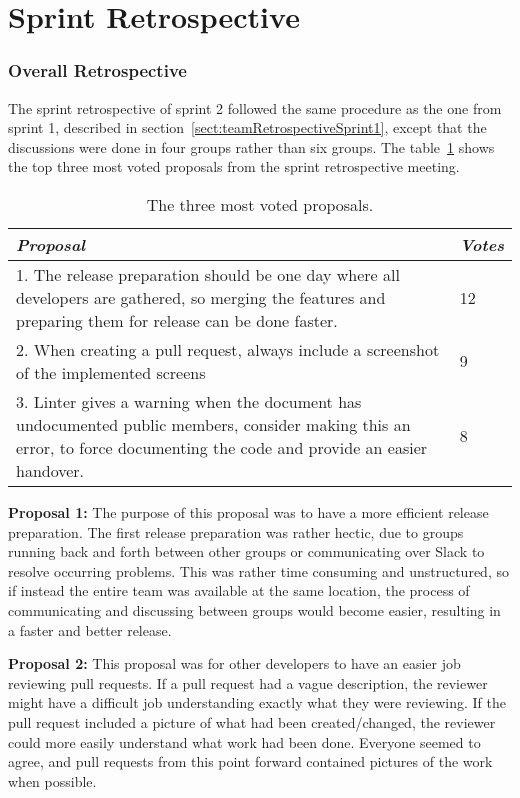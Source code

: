 \section{Sprint Retrospective}
\label{sect:retrospectiveSprint2}
\subsubsection{Overall Retrospective}
\label{sect:teamRetrospectiveSprint2}
The sprint retrospective of sprint 2 followed the same procedure as the one from sprint 1, described in section~\ref{sect:teamRetrospectiveSprint1}, except that the discussions were done in four groups rather than six groups.
The table~\ref{table:retrospectiveIdeasSprint2} shows the top three most voted proposals from the sprint retrospective meeting.


\begin{table}[H]
\begin{tabularx}{\textwidth}{X|l}
\textit{Proposal}    & \textit{Votes}  \\ \hline
1. The release preparation should be one day where all developers are gathered, so merging the features and preparing them for release can be done faster.  & 12  \\ \hline
2. When creating a pull request, always include a screenshot of the implemented screens & 9 \\ \hline
3. Linter gives a warning when the document has undocumented public members, consider making this an error, to force documenting the code and provide an easier handover. & 8  \\ \hline
\end{tabularx}
\caption{The three most voted proposals.}
\label{table:retrospectiveIdeasSprint2}
\end{table}

\textbf{Proposal 1:} The purpose of this proposal was to have a more efficient release preparation. The first release preparation was rather hectic, due to groups running back and forth between other groups or communicating over Slack to resolve occurring problems. This was rather time consuming and unstructured, so if instead the entire team was available at the same location, the process of communicating and discussing between groups would become easier, resulting in a faster and better release.

\textbf{Proposal 2:} This proposal was for other developers to have an easier job reviewing pull requests. If a pull request had a vague description, the reviewer might have a difficult job understanding exactly what they were reviewing. If the pull request included a picture of what had been created/changed, the reviewer could more easily understand what work had been done. Everyone seemed to agree, and pull requests from this point forward contained pictures of the work when possible.

